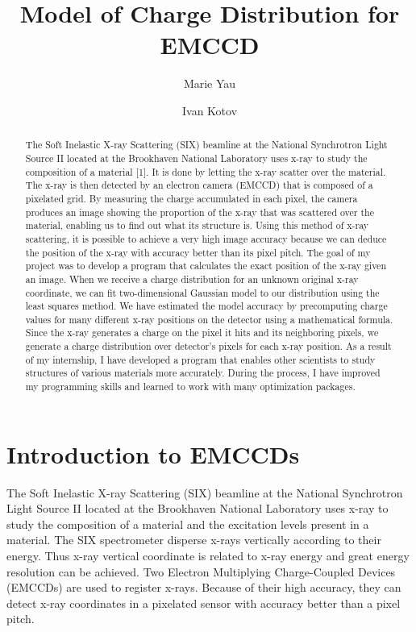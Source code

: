 \documentclass{article}
\title{Model of Charge Distribution for EMCCD}
\author[1]{Marie Yau}
\author[2]{Ivan Kotov}
\affil[1]{University of California, Berkeley}
\affil[2]{Brookhaven National Laboratory}
\begin{document}
\maketitle

\begin{abstract}
The Soft Inelastic X-ray Scattering (SIX) beamline at the National Synchrotron Light Source II located at the Brookhaven National Laboratory uses x-ray to study the composition of a material [1]. It is done by letting the x-ray scatter over the material. The x-ray is then detected by an electron camera (EMCCD) that is composed of a pixelated grid. By measuring the charge accumulated in each pixel, the camera produces an image showing the proportion of the x-ray that was scattered over the material, enabling us to find out what its structure is. Using this method of x-ray scattering, it is possible to achieve a very high image accuracy because we can deduce the position of the x-ray with accuracy better than its pixel pitch. The goal of my project was to develop a program that calculates the exact position of the x-ray given an image. When we receive a charge distribution for an unknown original x-ray coordinate, we can fit two-dimensional Gaussian model to our distribution using the least squares method. We have estimated the model accuracy by precomputing charge values for many different x-ray positions on the detector using a mathematical formula. Since the x-ray generates a charge on the pixel it hits and its neighboring pixels, we generate a charge distribution over detector’s pixels for each x-ray position. As a result of my internship, I have developed a program that enables other scientists to study structures of various materials more accurately. During the process, I have improved my programming skills and learned to work with many optimization packages.
\end{abstract}

\section{Introduction to EMCCDs}
The Soft Inelastic X-ray Scattering (SIX) beamline at the National Synchrotron Light Source II located at the Brookhaven National Laboratory uses x-ray to study the composition of a material and the excitation levels present in a material. The SIX spectrometer disperse x-rays vertically according to their energy. Thus x-ray vertical coordinate is related to x-ray energy and great energy resolution can be achieved. Two Electron Multiplying Charge-Coupled Devices (EMCCDs) are used to register x-rays. Because of their high accuracy, they can detect x-ray coordinates in a pixelated sensor with accuracy better than a pixel pitch. 
\end{document}
